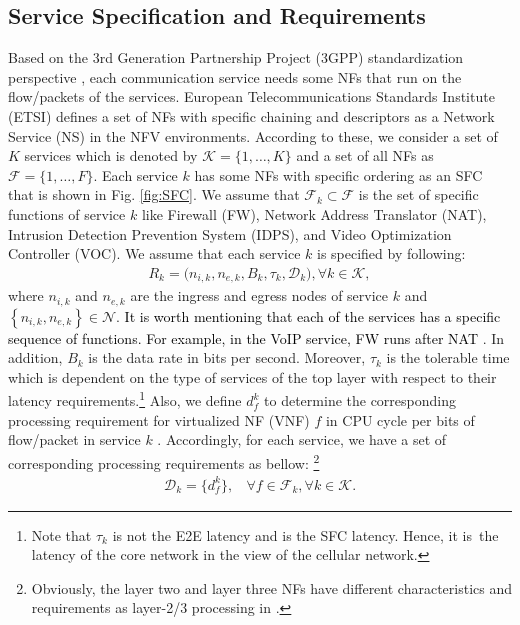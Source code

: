 \documentclass[20pt,twocolumn]{IEEEtran}
\begin{document}
	\subsection{Service Specification and Requirements}
Based on the 3rd Generation Partnership Project (3GPP) standardization perspective \cite{thirdgeneration2017system}, each communication service needs some NFs that run on the flow/packets of the services. European Telecommunications Standards Institute (ETSI) defines a set of NFs with specific chaining and descriptors as a Network Service (NS) \cite{etsi2014gs} in the NFV environments.  
According to these, we consider a set of $K$ services which is denoted by $\mathcal{K}=\{1,\dots, K\}$ and a set of all NFs as $\mathcal{F}=\{1,\dots,F\}$. Each service $k$ has some NFs with specific ordering as an SFC that is shown in Fig. \ref{fig:SFC}. We assume that  $\mathcal{F}_k \subset\mathcal{F}$ is the set of specific functions of service $k$ like Firewall (FW), Network Address Translator (NAT), Intrusion Detection Prevention System (IDPS), and Video Optimization Controller (VOC). We assume that each service $k$ is specified by following:
 \begin{align}
 R_k=\Big(n_{i,k},n_{e,k}, B_k,\tau_k,\mathcal{D}_k\Big), \forall k\in \mathcal{K},
 \end{align} 
 where $n_{i,k}$ and $n_{e,k}$ are the ingress and egress nodes of service $k$ \cite{pei2018virtual,hong2018resource} and $\left\lbrace n_{i,k},n_{e,k}\right\rbrace \in\mathcal{N}$. \textcolor{black}{It is worth mentioning that each of the services has a specific sequence of functions. For example, in the VoIP service, FW  runs after NAT} \cite{savi2019impact}. In addition, $B_k$ is the  data rate in bits per second. Moreover,	$\tau_k$ is the tolerable time which is dependent on the type of services of the top layer with respect to their latency requirements.\footnote{Note that $\tau_{k}$ is not the E2E latency and is the SFC latency. Hence, it is\ the latency of the core network in the view of the cellular network.} Also, we define $d^{k}_f$ to determine the corresponding  processing requirement for virtualized NF (VNF)  $f$ in CPU cycle per bits of flow/packet in service $k$ \cite{savi2019impact}. Accordingly, for each service, we have a set of corresponding processing requirements as bellow:
 \footnote{Obviously, the layer two and layer three NFs have different characteristics and requirements as layer-2/3 processing in \cite{liu2018microboxes}.}  
 \begin{align}
 	\mathcal{D}_{k}=\{d_{{f}}^k\}, ~~~~\forall f\in\mathcal{F}_{k}, \forall k \in \mathcal{K}.
 	\label{D_k}
 \end{align}
\end{document}
